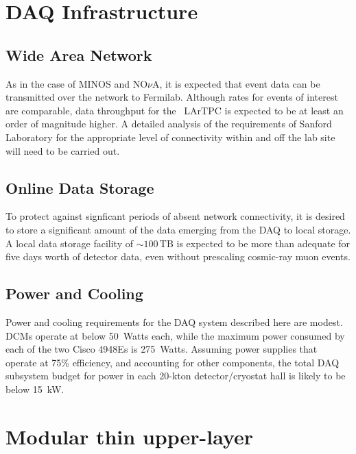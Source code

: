 \section{DAQ Infrastructure }
\label{sec:daq_infrastructure}

\subsection{Wide Area Network}

As in the case of MINOS and NO$\nu$A, it is expected that event data can be 
transmitted over the network to Fermilab.  Although rates for events of 
interest are comparable, data throughput for the \LBNE\ LArTPC is 
expected to be at least an order of magnitude higher.  A detailed 
analysis of the requirements of Sanford Laboratory for the appropriate level of 
connectivity within and off the lab site will need to be carried out.

\subsection{Online Data Storage}

To protect against signficant periods of absent network connectivity, it 
is desired to store a significant amount of the data emerging from the 
DAQ to local storage.  A local data storage facility of $\sim 100\,$TB is 
expected to be more than adequate for five days worth of detector data, 
even without prescaling cosmic-ray muon events.

\subsection{Power and Cooling}

Power and cooling requirements for the DAQ system described here are 
modest.  DCMs operate at below 50~Watts each, while the maximum power 
consumed by each of the two Cisco 4948Es is 275~Watts.  Assuming 
power supplies that operate at 75\% efficiency, and accounting for 
other components, the total DAQ subsystem budget for power 
in each 20-kton detector/cryostat hall is likely to be below 15~kW.

\section{Modular thin upper-layer}
\label{sec:daq_upper}

